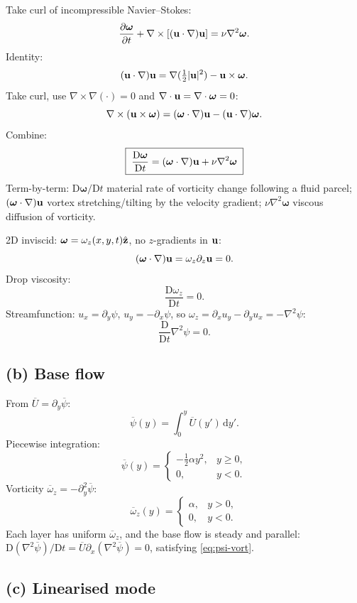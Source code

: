 \documentclass[11pt]{article}
\newcommand{\D}{\mathrm{D}}
\newcommand{\de}{\mathrm{d}}
\newcommand{\pd}[2]{\frac{\partial #1}{\partial #2}}
\newcommand{\Lap}{\nabla^{2}}
\begin{document}
Take curl of incompressible Navier--Stokes:
\[
\pd{\bm\omega}{t}+\nabla\times[(\vb u\cdot\nabla)\vb u]=\nu\Lap\bm\omega.
\]
Identity:
\[
(\vb u\cdot\nabla)\vb u=\nabla(\tfrac12|\vb u|^2)-\vb u\times\bm\omega.
\]
Take curl, use $\nabla\times\nabla(\cdot)=0$ and $\nabla\cdot\vb u=\nabla\cdot\bm\omega=0$:
\[
\nabla\times(\vb u\times\bm\omega)=(\bm\omega\cdot\nabla)\vb u-(\vb u\cdot\nabla)\bm\omega.
\]
Combine:
\begin{equation}
\boxed{\;\frac{\D\bm\omega}{\D t}=(\bm\omega\cdot\nabla)\vb u+\nu\Lap\bm\omega\;}
\label{eq:vort}
\end{equation}
Term-by-term: $\D\bm\omega/\D t$ material rate of vorticity change following a fluid parcel; $(\bm\omega\cdot\nabla)\vb u$ vortex stretching/tilting by the velocity gradient; $\nu\Lap\bm\omega$ viscous diffusion of vorticity.

2D inviscid: $\bm\omega=\omega_z(x,y,t)\hat{\vb z}$, no $z$-gradients in $\vb u$:
\[
(\bm\omega\cdot\nabla)\vb u=\omega_z\partial_z\vb u=0.
\]
Drop viscosity:
\[
\frac{\D\omega_z}{\D t}=0.
\]
Streamfunction: $u_x=\partial_y\psi$, $u_y=-\partial_x\psi$, so $\omega_z=\partial_x u_y-\partial_y u_x=-\Lap\psi$:
\begin{equation}
\frac{\D}{\D t}\Lap\psi=0.
\label{eq:psi-vort}
\end{equation}

\subsection*{(b) Base flow}

From $\overline U=\partial_y\overline\psi$:
\[
\overline\psi(y)=\int_0^y\overline U(y')\,\de y'.
\]
Piecewise integration:
\[
\overline\psi(y)=\begin{cases}-\tfrac12\alpha y^2,& y\ge 0,\\ 0,& y<0.\end{cases}
\]
Vorticity $\overline\omega_z=-\partial_y^2\overline\psi$:
\[
\boxed{\;\overline\omega_z(y)=\begin{cases}\alpha,& y>0,\\ 0,& y<0.\end{cases}\;}
\]
Each layer has uniform $\overline\omega_z$, and the base flow is steady and parallel: $\D(\Lap\overline\psi)/\D t=\overline U\partial_x(\Lap\overline\psi)=0$, satisfying \eqref{eq:psi-vort}.

\subsection*{(c) Linearised mode}
\end{document}
